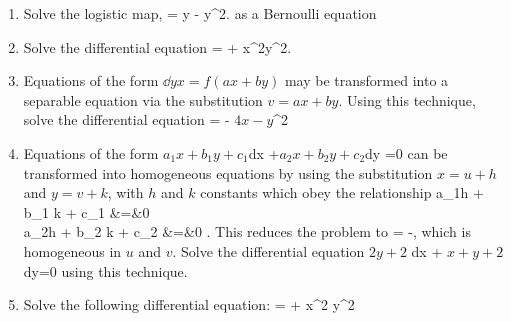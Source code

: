 \documentclass[12pt]{book}
\begin{document}
\begin{enumerate}
\item
Solve the logistic map,
\bee
{} = y - y^2.
\eee
as a Bernoulli equation

\item
Solve the differential equation
\bee
{} =  + x^2y^2.
\eee
{}

\item
  Equations of the form $\dd{y}{x} = f(ax+by)$ may be transformed into a
  separable equation via the substitution  $v=ax + by$. Using this technique,
  solve the differential equation
  \bee
   = - \(4x -y\)^2
  \eee

\item
  Equations of the form
  \bee
  \(a_1 x + b_1 y + c_1\)dx +\(a_2 x + b_2 y + c_2\)dy =0
  \eee
  can be transformed into homogeneous equations by using the substitution
  $x=u+h$ and $y=v+k$, with $h$ and $k$ constants which obey the relationship
  \bee
  a_1h + b_1 k + c_1 &=&0 \\
  a_2h + b_2 k + c_2 &=&0 .
  \eee
  This reduces the problem to
  \bee
   = -,
  \eee
  which is homogeneous in $u$ and $v$.
  Solve the differential equation
  \bee
  \(2y + 2\) dx + \(x +y+2\) dy=0
  \eee
  using this technique.



  \item
    Solve the following differential equation:
    \bee
     =  + x^2 y^2
    \eee

\end{enumerate}
\end{document}
